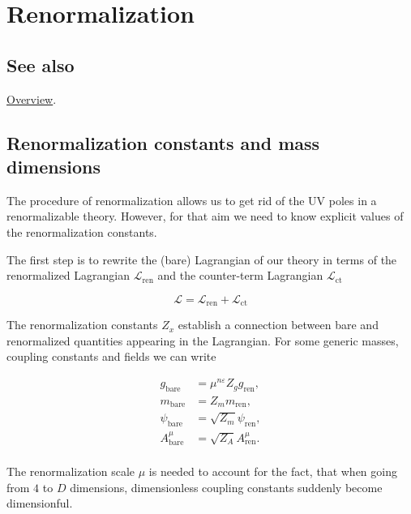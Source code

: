 \documentclass[../FeynCalcManual.tex]{subfiles}
\begin{document}
\hypertarget{renormalization}{
\section{Renormalization}\label{renormalization}}

\subsection{See also}

\hyperlink{toc}{Overview}.

\hypertarget{renormalization-constants-and-mass-dimensions}{%
\subsection{Renormalization constants and mass
dimensions}\label{renormalization-constants-and-mass-dimensions}}

The procedure of renormalization allows us to get rid of the UV poles in
a renormalizable theory. However, for that aim we need to know explicit
values of the renormalization constants.

The first step is to rewrite the (bare) Lagrangian of our theory in
terms of the renormalized Lagrangian \(\mathcal{L}_{\textrm{ren}}\) and
the counter-term Lagrangian \(\mathcal{L}_{\textrm{ct}}\)

\begin{equation}
\mathcal{L}  = \mathcal{L}_{\textrm{ren}} + \mathcal{L}_{\textrm{ct}}
\end{equation}

The renormalization constants \(Z_x\) establish a connection between
bare and renormalized quantities appearing in the Lagrangian. For some
generic masses, coupling constants and fields we can write

\begin{align*}
g_{\textrm{bare}} &=  \mu^{n \varepsilon} Z_g g_{\textrm{ren}}, \\
m_{\textrm{bare}} &=  Z_m m_{\textrm{ren}}, \\
\psi_{\textrm{bare}} &=  \sqrt{Z_m} \psi_{\textrm{ren}}, \\
A^\mu_{\textrm{bare}} &=  \sqrt{Z_A} A^\mu_{\textrm{ren}}. \\
\end{align*}

The renormalization scale \(\mu\) is needed to account for the fact,
that when going from \(4\) to \(D\) dimensions, dimensionless coupling
constants suddenly become dimensionful.
\end{document}
